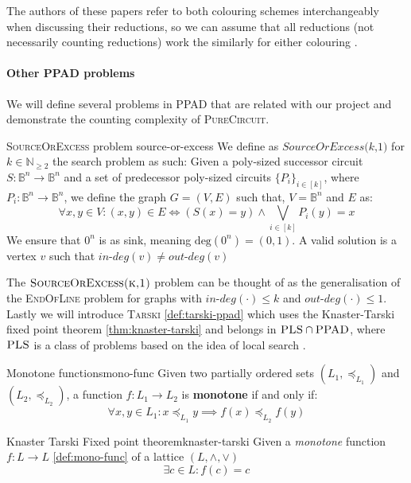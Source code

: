The authors of these papers refer to both colouring schemes interchangeably when discussing their reductions,
so we can assume that all reductions (not necessarily counting reductions) work the similarly for either colouring
\cite{chen_SettlingComplexityComputing_2009, deligkas_PureCircuitTightInapproximability_2024, daskalakis_ComplexityComputingNash_2006, chen_Complexity2DDiscrete_2009}.


\paragraph{Other PPAD problems} 

We will define several problems in \textsc{PPAD} that are related with our project
and demonstrate the counting complexity of \textsc{PureCircuit}.

\begin{definitionbox}{\textsc{SourceOrExcess} problem \cite{ikenmeyer_WhatWhatNot_2022}}{source-or-excess}
    We define as $\textit{SourceOrExcess(k,1)}$ for $k \in \mathbb{N}_{\geq 2}$
    the search problem as such: Given a poly-sized successor circuit $S : \mathbb{B}^n \to \mathbb{B}^n$
    and a set of predecessor poly-sized circuits $\{P_i\}_{i \in [k]}$, where $P_i : \mathbb{B}^n \to \mathbb{B}^n$, we define
    the graph $G = (V,E)$ such that, $V = \mathbb{B}^n$ and $E$ as:
    $$
    \forall x, y \in V: (x,y) \in E \iff (S(x) = y) \wedge \bigvee_{i \in [k]} P_i(y) = x
    $$
    We ensure that $0^n$ is as sink, meaning $\text{deg}(0^n) = (0,1)$.
    A valid solution is a vertex $v$ such that $\textit{in-deg}(v) \neq \textit{out-deg}(v)$
\end{definitionbox}

The $\textsc{SourceOrExcess(k,1)}$ problem can be thought of as the generalisation of the \textsc{EndOfLine}
problem for graphs with $\textit{in-deg}(\cdot) \leq k$ and $\textit{out-deg}(\cdot) \leq 1$.
Lastly we will introduce \textsc{Tarski} \ref{def:tarski-ppad}
which uses the Knaster-Tarski fixed point theorem \ref{thm:knaster-tarski} and
belongs in $\textsc{PLS} \cap \textsc{PPAD}$, where  $\textsc{PLS}$ is a class of problems based on the idea of local search \cite{johnson_HowEasyLocal_1988}.
%
%
\begin{definitionbox}{Monotone functions}{mono-func}
    Given two partially ordered sets $(L_1, \preceq_{L_1})$ and $(L_2, \preceq_{L_2})$, a function
    $f: L_1 \to L_2$ is \textbf{monotone} if and only if:
    $$
    \forall x,y \in L_1: x \preceq_{L_1} y \implies f(x) \preceq_{L_2} f(y)
    $$
\end{definitionbox}
%     
%
\begin{theorembox}{Knaster Tarski Fixed point theorem\cite{bronislaw_TheoremeFunctionsDensembles_1928, fearnley_FasterAlgorithmFinding_2022}}{knaster-tarski}
    Given a \textit{monotone} function $f: L \to L$ \ref{def:mono-func} of a lattice $(L, \wedge, \vee)$
    $$
    \exists c \in L: f(c) = c
    $$
\end{theorembox}

